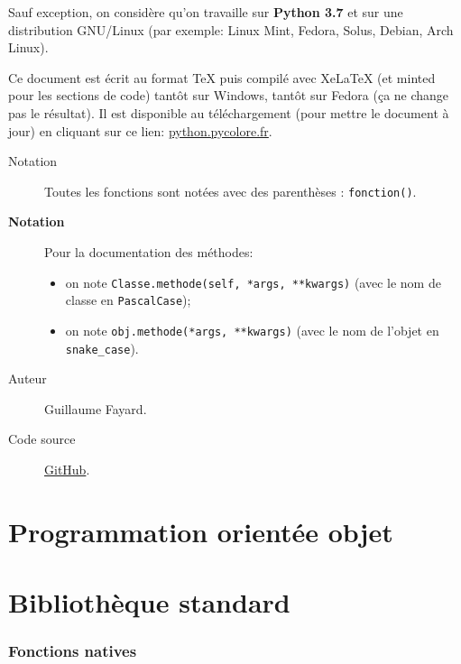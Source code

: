 \documentclass[a4paper, 10pt]{article}
\begin{document}
Sauf exception, on considère qu'on travaille sur \textbf{Python 3.7} et sur une distribution GNU/Linux (par exemple: Linux Mint, Fedora, Solus, Debian, Arch Linux).\medskip

Ce document est écrit au format TeX puis compilé avec XeLaTeX (et minted pour les sections de code) tantôt sur Windows, tantôt sur Fedora (ça ne change pas le résultat). Il est disponible au téléchargement (pour mettre le document à jour) en cliquant sur ce lien: \href{http://python.pycolore.fr}{python.pycolore.fr}.\medskip

\begin{description}
    \item[{\sffamily Notation}] Toutes les fonctions sont notées avec des parenthèses : \texttt{fonction()}.	\item[{\bfseries\sffamily Notation}] Pour la documentation des méthodes:
        \begin{itemize}
            \item on note \texttt{Classe.methode(self, *args, **kwargs)} (avec le nom de classe en \texttt{PascalCase});
            \item on note \texttt{obj.methode(*args, **kwargs)} (avec le nom de l'objet en \texttt{snake_case}).
        \end{itemize} 
    \item[{\sffamily Auteur}] Guillaume Fayard.
    \item[{\sffamily Code source}] \href{https://github.com/Arkelis/memo-python}{GitHub}.
\end{description}

\newpage
\part{Programmation orientée objet}











\newpage

\part{Bibliothèque standard}
\section{Fonctions natives}
\end{document}
